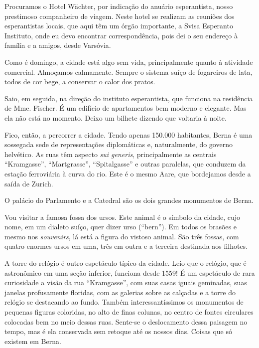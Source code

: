 Procuramos o Hotel Wächter, por indicação do anuário esperantista, nosso prestimoso companheiro de viagem. Neste hotel se realizam as reuniões dos esperantistas locais, que aqui têm um órgão importante, a Svisa Esperanto Instituto, onde eu devo encontrar correspondência, pois dei o seu endereço à família e a amigos, desde Varsóvia.

Como é domingo, a cidade está algo sem vida, principalmente quanto à atividade comercial. Almoçamos calmamente. Sempre o sistema suíço de fogareiros de lata, todos de cor bege, a conservar o calor dos pratos.

Saio, em seguida, na direção do instituto esperantista, que funciona na residência de Mme. Fischer. É um edifício de apartamentos bem moderno e elegante. Mas ela não está no momento. Deixo um bilhete dizendo que voltaria à noite.

Fico, então, a percorrer a cidade. Tendo apenas 150.000 habitantes, Berna é uma sossegada sede de representações diplomáticas e, naturalmente, do governo helvético. As ruas têm aspecto \textit{sui generis}, principalmente as centrais ``Kramgasse'', ``Martgrasse'', ``Spitalgasse'' e outras paralelas, que conduzem da estação ferroviária à curva do rio. Este é o mesmo Aare, que bordejamos desde a saída de Zurich.

O palácio do Parlamento e a Catedral são os dois grandes monumentos de Berna.

Vou visitar a famosa fossa dos ursos. Este animal é o símbolo da cidade, cujo nome, em um dialeto suíço, quer dizer urso (``bern''). Em todos os brasões e mesmo nos \textit{souvenirs}, lá está a figura do vistoso animal. São três fossas, com quatro enormes ursos em uma, três em outra e a terceira destinada aos filhotes.

A torre do relógio é outro espetáculo típico da cidade. Leio que o relógio, que é astronômico em uma seção inferior, funciona desde 1559! É um espetáculo de rara curiosidade a visão da rua ``Kramgasse'', com suas casas iguais geminadas, suas janelas profusamente floridas, com as galerias sobre as calçadas e a torre do relógio se destacando ao fundo. Também interessantíssimos os monumentos de pequenas figuras coloridas, no alto de finas colunas, no centro de fontes circulares colocadas bem no meio dessas ruas. Sente-se o deslocamento dessa paisagem no tempo, mas é ela conservada sem retoque até os nossos dias. Coisas que só existem em Berna.


